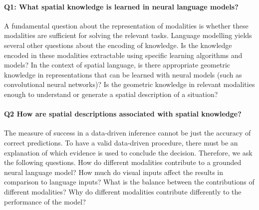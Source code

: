 \paragraph{Q1: What spatial knowledge is learned in neural language models?} 
A fundamental question about the representation of modalities is whether these modalities are sufficient for solving the relevant tasks. Language modelling yields several other questions about the encoding of knowledge. 
Is the knowledge encoded in these modalities extractable using specific learning algorithms and models?
In the context of spatial language, is there appropriate geometric knowledge in representations that can be learned with neural models (such as convolutional neural networks)? 
Is the geometric knowledge in relevant modalities enough to understand or generate a spatial description of a situation?

\paragraph{Q2 How are spatial descriptions associated with spatial knowledge?} 
The measure of success in a data-driven inference cannot be just the accuracy of correct predictions. 
To have a valid data-driven procedure, there must be an explanation of which evidence is used to conclude the decision. 
Therefore, we ask the following questions. 
How do different modalities contribute to a grounded neural language model? 
How much do visual inputs affect the results in comparison to language inputs? 
What is the balance between the contributions of different modalities? Why do different modalities contribute differently to the performance of the model?

